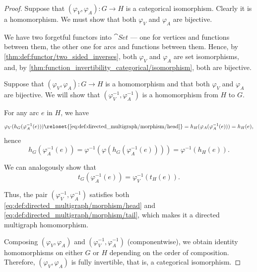 \begin{proof}

  \SufficiencySubProof* Suppose that \( (\varphi_V, \varphi_A): G \to H \) is a categorical isomorphism. Clearly it is a homomorphism. We must show that both \( \varphi_V \) and \( \varphi_A \) are bijective.

  We have two forgetful functors into \( \cat{Set} \) --- one for vertices and functions between them, the other one for arcs and functions between them. Hence, by \cref{thm:def:functor/two_sided_inverses}, both \( \varphi_V \) and \( \varphi_A \) are set isomorphisms, and, by \cref{thm:function_invertibility_categorical/isomorphism}, both are bijective.

  \NecessitySubProof* Suppose that \( (\varphi_V, \varphi_A): G \to H \) is a homomorphism and that both \( \varphi_V \) and \( \varphi_A \) are bijective. We will show that \( (\varphi_V^{-1}, \varphi_A^{-1}) \) is a homomorphism from \( H \) to \( G \).

  For any arc \( e \) in \( H \), we have
  \begin{equation*}
    \varphi_V(h_G(\varphi^{-1}_A(e)))
    \reloset {\eqref{eq:def:directed_multigraph/morphism/head}} =
    h_H(\varphi_A(\varphi^{-1}_A(e)))
    =
    h_H(e),
  \end{equation*}
  hence
  \begin{equation*}
    h_G(\varphi^{-1}_A(e))
    =
    \varphi^{-1}(\varphi(h_G(\varphi^{-1}_A(e))))
    =
    \varphi^{-1}(h_H(e)).
  \end{equation*}

  We can analogously show that
  \begin{equation*}
    t_G(\varphi^{-1}_A(e)) = \varphi^{-1}_V(t_H(e)).
  \end{equation*}

  Thus, the pair \( (\varphi_V^{-1}, \varphi_A^{-1}) \) satisfies both \eqref{eq:def:directed_multigraph/morphism/head} and \eqref{eq:def:directed_multigraph/morphism/tail}, which makes it a directed multigraph homomorphism.

  Composing \( (\varphi_V, \varphi_A) \) and \( (\varphi_V^{-1}, \varphi_A^{-1}) \) (componentwise), we obtain identity homomorphisms on either \( G \) or \( H \) depending on the order of composition. Therefore, \( (\varphi_V, \varphi_A) \) is fully invertible, that is, a categorical isomorphism.



\end{proof}
